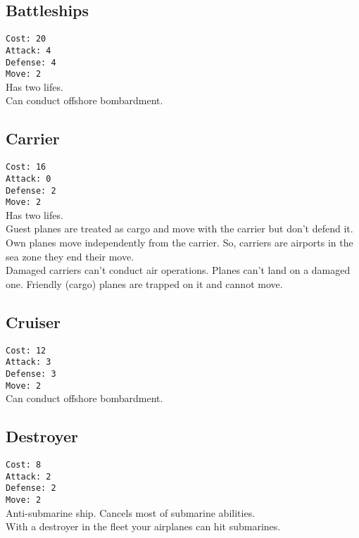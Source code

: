 \documentclass[10pt,a4paper,landscape]{article}
\begin{document}
\begin{multicols*}{3}
\pagebreak

\subsection*{Battleships}
\texttt{Cost: 20 \\ Attack: 4 \\ Defense: 4 \\ Move: 2}
\\
Has two lifes.\\
Can conduct offshore bombardment.

\subsection*{Carrier}
\texttt{Cost: 16 \\ Attack: 0 \\ Defense: 2 \\ Move: 2}
\\
Has two lifes.\\
Guest planes are treated as cargo and move with the carrier but don't defend it. Own planes move independently from the carrier. So, carriers are airports in the sea zone they end their move.\\
Damaged carriers can't conduct air operations. Planes can't land on a damaged one. Friendly (cargo) planes are trapped on it and cannot move.

\subsection*{Cruiser}
\texttt{Cost: 12 \\ Attack: 3 \\ Defense: 3 \\ Move: 2}
\\
Can conduct offshore bombardment.

\subsection*{Destroyer}
\texttt{Cost: 8 \\ Attack: 2 \\ Defense: 2 \\ Move: 2}
\\
Anti-submarine ship. Cancels most of submarine abilities.\\
With a destroyer in the fleet your airplanes can hit submarines.


\end{multicols*}
\end{document}
